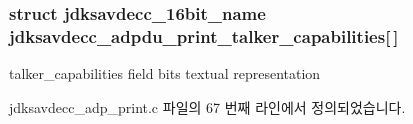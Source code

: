 \subsubsection[{\texorpdfstring{jdksavdecc\+\_\+adpdu\+\_\+print\+\_\+talker\+\_\+capabilities}{jdksavdecc_adpdu_print_talker_capabilities}}]{\setlength{\rightskip}{0pt plus 5cm}struct {\bf jdksavdecc\+\_\+16bit\+\_\+name} jdksavdecc\+\_\+adpdu\+\_\+print\+\_\+talker\+\_\+capabilities\mbox{[}$\,$\mbox{]}}\hypertarget{group__adp__print_ga0aef8e9a7f6f1f06031a411798f7718e}{}\label{group__adp__print_ga0aef8e9a7f6f1f06031a411798f7718e}


talker\+\_\+capabilities field bits textual representation 



jdksavdecc\+\_\+adp\+\_\+print.\+c 파일의 67 번째 라인에서 정의되었습니다.

